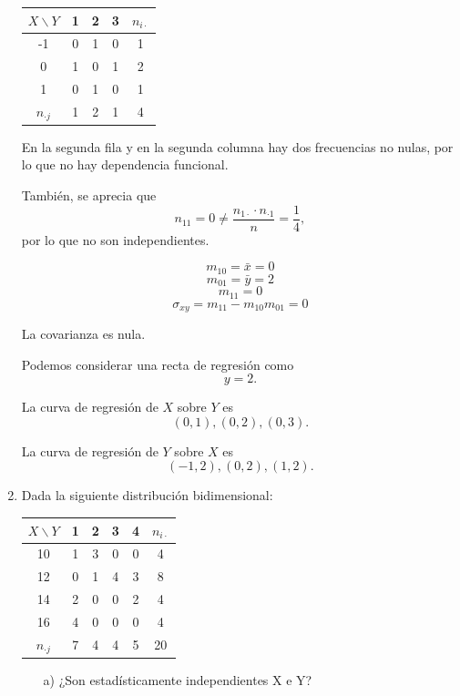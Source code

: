 \documentclass[10pt,a4paper]{article}
\begin{document}
\begin{enumerate}
\bigskip

\begin{center}
\begin{tabular}{c|ccc|c}
$X \backslash Y$ & 1 & 2 & 3 & $n_{i\cdot}$\\\hline
-1 & 0 & 1 & 0 & 1 \\
0 & 1 & 0 & 1 & 2 \\
1 & 0 & 1 & 0 & 1 \\\hline
$n_{\cdot j}$ & 1 & 2 & 1 & 4 \\
\end{tabular}
\end{center}

En la segunda fila y en la segunda columna hay dos frecuencias no nulas, por lo que no hay dependencia funcional.

También, se aprecia que $$n_{11} = 0 \not = \frac{n_{1\cdot}\cdot n_{\cdot 1}}{n} = \frac{1}{4},$$ por lo que no son independientes.

$$m_{10} = \bar x = 0$$
$$m_{01} = \bar y = 2$$
$$m_{11} = 0$$
$$\sigma_{xy} = m_{11} - m_{10}m_{01} = 0$$

La covarianza es nula.

Podemos considerar una recta de regresión como $$y = 2.$$

La curva de regresión de $X$ sobre $Y$ es $$(0,1), (0,2), (0,3).$$

La curva de regresión de $Y$ sobre $X$ es $$(-1,2), (0,2), (1,2).$$

\newpage

\item Dada la siguiente distribución bidimensional:

\begin{center}
\begin{tabular}{c|cccc|c}
$X \backslash Y$ & 1 & 2 & 3 & 4 & $n_{i\cdot}$\\\hline
10 & 1 & 3 & 0 & 0 & 4 \\
12 & 0 & 1 & 4 & 3 & 8 \\
14 & 2 & 0 & 0 & 2 & 4 \\
16 & 4 & 0 & 0 & 0 & 4\\\hline
$n_{\cdot j}$ & 7 & 4 & 4 & 5 & 20\\
\end{tabular}
\end{center}

\begin{itemize}

\item[a)]¿Son estadísticamente independientes X e Y?


\end{itemize}
\end{enumerate}
\end{document}
